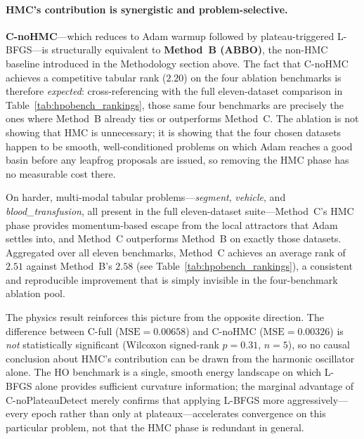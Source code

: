 \documentclass[11pt]{article}
\theoremstyle{definition}
\begin{document}
\paragraph{HMC's contribution is synergistic and problem-selective.}
\textbf{C-noHMC}---which reduces to Adam warmup followed by
plateau-triggered L-BFGS---is structurally equivalent to
\textbf{Method~B (ABBO)}, the non-HMC baseline introduced
in the Methodology section above.  The fact that C-noHMC achieves
a competitive tabular rank ($2.20$) on the four ablation
benchmarks is therefore \emph{expected}: cross-referencing with
the full eleven-dataset comparison in
Table~\ref{tab:hpobench_rankings}, those same four benchmarks
are precisely the ones where Method~B already ties or outperforms
Method~C.  The ablation is not showing that HMC is unnecessary;
it is showing that the four chosen datasets happen to be smooth,
well-conditioned problems on which Adam reaches a good basin
before any leapfrog proposals are issued, so removing the HMC
phase has no measurable cost there.

On harder, multi-modal tabular problems---\textit{segment},
\textit{vehicle}, and \textit{blood\_transfusion}, all present in
the full eleven-dataset suite---Method~C's HMC phase provides
momentum-based escape from the local attractors that Adam settles
into, and Method~C outperforms Method~B on exactly those datasets.
Aggregated over all eleven benchmarks, Method~C achieves an
average rank of $2.51$ against Method~B's $2.58$ (see
Table~\ref{tab:hpobench_rankings}), a consistent and reproducible
improvement that is simply invisible in the four-benchmark
ablation pool.

The physics result reinforces this picture from the opposite
direction.  The difference between C-full
($\mathrm{MSE}=0.00658$) and C-noHMC ($\mathrm{MSE}=0.00326$)
is \emph{not} statistically significant (Wilcoxon signed-rank
$p=0.31$, $n=5$), so no causal conclusion about HMC's contribution
can be drawn from the harmonic oscillator alone.  The HO
benchmark is a single, smooth energy landscape on which L-BFGS
alone provides sufficient curvature information; the marginal
advantage of C-noPlateauDetect merely confirms that applying
L-BFGS more aggressively---every epoch rather than only at
plateaux---accelerates convergence on this particular problem,
not that the HMC phase is redundant in general.
\end{document}
